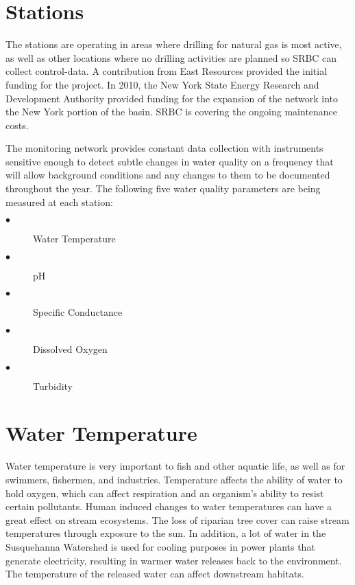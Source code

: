 \documentclass[a4paper]{article}
\begin{document}
\newpage
\begin{minipage}[t]{0.45\textwidth}
\section*{\small Stations}
{\normalsize  The stations are operating in areas where drilling for natural gas is most active, as well as other locations where no drilling activities are planned so SRBC can collect control-data. A contribution from East Resources provided the initial funding for the project. In 2010, the New York State Energy Research and Development Authority provided funding for the expansion of the network into the New York portion of the basin. SRBC is covering the ongoing maintenance costs. \par
The monitoring network provides constant data collection with instruments sensitive enough to detect subtle changes in water quality on a frequency that will allow background conditions and any changes to them to be documented throughout the year. The following five water quality parameters are being measured at each station:
\begin{description}
  \item[$\bullet$ ] Water Temperature
  \item[$\bullet$ ] pH
  \item[$\bullet$ ] Specific Conductance
  \item[$\bullet$ ] Dissolved Oxygen
  \item[$\bullet$ ] Turbidity
\end{description}
}
\section*{\small Water Temperature}
{\normalsize Water temperature is very important to fish and other aquatic life, as well as for swimmers, fishermen, and industries. Temperature affects the ability of water to hold oxygen, which can affect respiration and an organism's ability to resist certain pollutants. Human induced changes to water temperatures can have a great effect on stream ecosystems. The loss of riparian tree cover can raise stream temperatures through exposure to the sun. In addition, a lot of water in the Susquehanna Watershed is used for cooling purposes in power plants that generate electricity, resulting in warmer water releases back to the environment. The temperature of the released water can affect downstream habitats.}

\end{minipage}
\end{document}
